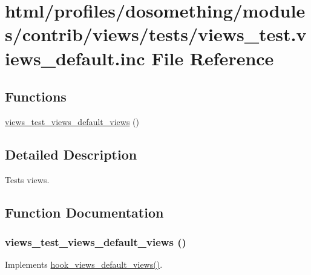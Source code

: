\hypertarget{views__test_8views__default_8inc}{
\section{html/profiles/dosomething/modules/contrib/views/tests/views\_\-test.views\_\-default.inc File Reference}
\label{views__test_8views__default_8inc}
}
\subsection*{Functions}
\begin{DoxyCompactItemize}
\item 
\hyperlink{views__test_8views__default_8inc_a97285c29d12bfe4d937ea6c6323943a6}{views\_\-test\_\-views\_\-default\_\-views} ()
\end{DoxyCompactItemize}


\subsection{Detailed Description}
Tests views. 

\subsection{Function Documentation}
\hypertarget{views__test_8views__default_8inc_a97285c29d12bfe4d937ea6c6323943a6}{
\subsubsection[{views\_\-test\_\-views\_\-default\_\-views}]{\setlength{\rightskip}{0pt plus 5cm}views\_\-test\_\-views\_\-default\_\-views ()}}
\label{views__test_8views__default_8inc_a97285c29d12bfe4d937ea6c6323943a6}
Implements \hyperlink{group__views__hooks_ga23edb74860682fa88f75cf94b97c2e15}{hook\_\-views\_\-default\_\-views()}. 